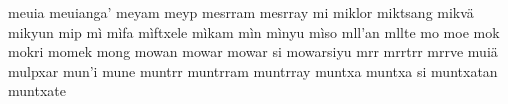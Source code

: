\documentclass[a4paper]{article}
\begin{document}
meuia\hspace{2mm}
meuianga'\hspace{2mm}
meyam\hspace{2mm}
meyp\hspace{2mm}
mesrram\hspace{2mm}
mesrray\hspace{2mm}
mi\hspace{2mm}
miklor\hspace{2mm}
miktsang\hspace{2mm}
mikvä\hspace{2mm}
mikyun\hspace{2mm}
mip\hspace{2mm}
mì\hspace{2mm}
mìfa\hspace{2mm}
mìftxele\hspace{2mm}
mìkam\hspace{2mm}
mìn\hspace{2mm}
mìnyu\hspace{2mm}
mìso\hspace{2mm}
mll'an\hspace{2mm}
mllte\hspace{2mm}
mo\hspace{2mm}
moe\hspace{2mm}
mok\hspace{2mm}
mokri\hspace{2mm}
momek\hspace{2mm}
mong\hspace{2mm}
mowan\hspace{2mm}
mowar\hspace{2mm}
mowar si\hspace{2mm}
mowarsiyu\hspace{2mm}
mrr\hspace{2mm}
mrrtrr\hspace{2mm}
mrrve\hspace{2mm}
muiä\hspace{2mm}
mulpxar\hspace{2mm}
mun'i\hspace{2mm}
mune\hspace{2mm}
muntrr\hspace{2mm}
muntrram\hspace{2mm}
muntrray\hspace{2mm}
muntxa\hspace{2mm}
muntxa si\hspace{2mm}
muntxatan\hspace{2mm}
muntxate\hspace{2mm}
\end{document}
